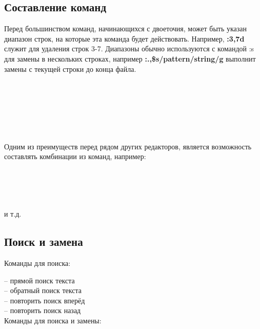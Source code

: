 \subsection*{Составление команд}
Перед большинством команд, начинающихся с двоеточия, может быть указан диапазон строк, на которые эта команда будет действовать. Например, \textbf{:3,7d} служит для удаления строк 3-7. Диапазоны обычно используются с командой :s для замены в нескольких строках, например \textbf{:.,\$s/pattern/string/g} выполнит замены с текущей строки до конца файла.

\noindent
{}\\
\\
\\
\\
\\
\\


Одним из преимуществ  перед рядом других редакторов, является возможность составлять комбинации из команд, например:

\noindent
{}\\
\\
\\
\\
и т.д.

\subsection*{Поиск и замена}

Команды для поиска:

\noindent
\keys{/} -- прямой поиск текста\\
 -- обратный поиск текста\\
 -- повторить поиск вперёд\\
 -- повторить поиск назад\\

Команды для поиска и замены:

\noindent
{}\\
\\
\\
\\
\\

